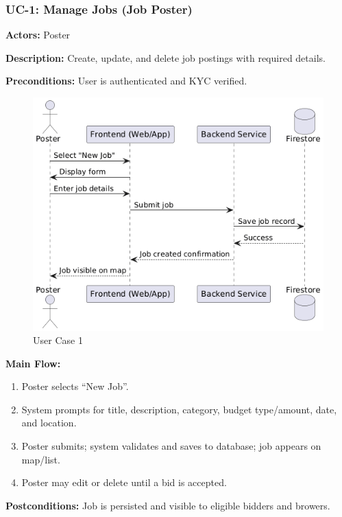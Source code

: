 \documentclass[11pt]{article}
\begin{document}
\subsubsection*{UC-1: Manage Jobs (Job Poster)}
\textbf{Actors:} Poster \par
\textbf{Description:} Create, update, and delete job postings with required details.\par
\textbf{Preconditions:} User is authenticated and KYC verified.\par
\begin{figure}[h]
  \centering
\includegraphics[width=0.9\linewidth]{UC-1.png}
  \caption{User Case 1}
\end{figure} \par
\vspace{2em}
\textbf{Main Flow:}
\begin{enumerate}[leftmargin=1.4em]
  \item Poster selects ``New Job''.
  \item System prompts for title, description, category, budget type/amount, date, and location.
  \item Poster submits; system validates and saves to database; job appears on map/list.
  \item Poster may edit or delete until a bid is accepted.
\end{enumerate}
\textbf{Postconditions:} Job is persisted and visible to eligible bidders and browers.
\end{document}
